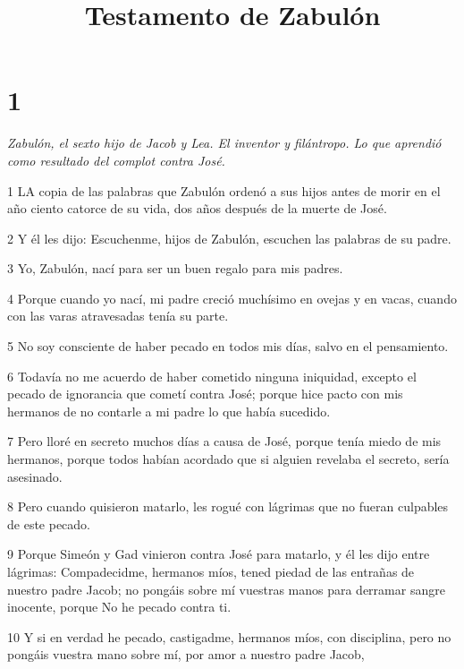 

\title{Testamento de Zabulón}

\chapter{1}

\par \textit{Zabulón, el sexto hijo de Jacob y Lea. El inventor y filántropo. Lo que aprendió como resultado del complot contra José.}

\par 1 LA copia de las palabras que Zabulón ordenó a sus hijos antes de morir en el año ciento catorce de su vida, dos años después de la muerte de José.

\par 2 Y él les dijo: Escuchenme, hijos de Zabulón, escuchen las palabras de su padre.

\par 3 Yo, Zabulón, nací para ser un buen regalo para mis padres.

\par 4 Porque cuando yo nací, mi padre creció muchísimo en ovejas y en vacas, cuando con las varas atravesadas tenía su parte.

\par 5 No soy consciente de haber pecado en todos mis días, salvo en el pensamiento.

\par 6 Todavía no me acuerdo de haber cometido ninguna iniquidad, excepto el pecado de ignorancia que cometí contra José; porque hice pacto con mis hermanos de no contarle a mi padre lo que había sucedido.

\par 7 Pero lloré en secreto muchos días a causa de José, porque tenía miedo de mis hermanos, porque todos habían acordado que si alguien revelaba el secreto, sería asesinado.

\par 8 Pero cuando quisieron matarlo, les rogué con lágrimas que no fueran culpables de este pecado.

\par 9 Porque Simeón y Gad vinieron contra José para matarlo, y él les dijo entre lágrimas: Compadecidme, hermanos míos, tened piedad de las entrañas de nuestro padre Jacob; no pongáis sobre mí vuestras manos para derramar sangre inocente, porque No he pecado contra ti.

\par 10 Y si en verdad he pecado, castigadme, hermanos míos, con disciplina, pero no pongáis vuestra mano sobre mí, por amor a nuestro padre Jacob,

